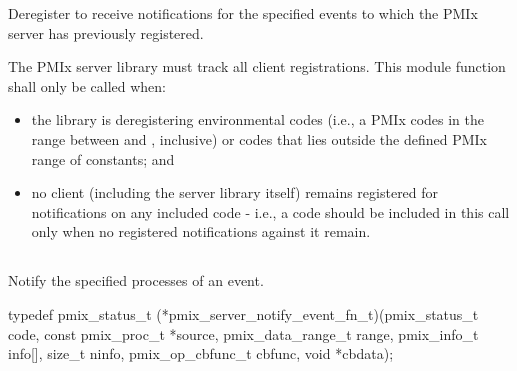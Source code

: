\descr

Deregister to receive notifications for the specified events to which the \ac{PMIx} server has previously registered.

\adviceimplstart
The \ac{PMIx} server library must track all client registrations. This module function shall only be called when:

\begin{itemize}
    \item the library is deregistering environmental codes (i.e., a \ac{PMIx} codes in the range between  and , inclusive) or codes that lies outside the defined \ac{PMIx} range of constants; and
    \item no client (including the server library itself) remains registered for notifications on any included code - i.e., a code should be included in this call only when no registered notifications against it remain.
\end{itemize}

\adviceimplend


\subsection{}

\summary

Notify the specified processes of an event.

\format

\cspecificstart
\begin{codepar}
typedef pmix_status_t (*pmix_server_notify_event_fn_t)(pmix_status_t code,
                             const pmix_proc_t *source,
                             pmix_data_range_t range,
                             pmix_info_t info[],
                             size_t ninfo,
                             pmix_op_cbfunc_t cbfunc,
                             void *cbdata);
\end{codepar}
\cspecificend

\begin{arglist}
\end{arglist}

